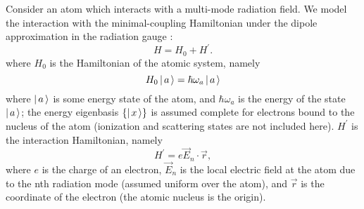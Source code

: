 \label{general dynamics}
Consider an atom which interacts with a multi-mode radiation field. We model the interaction with the minimal-coupling Hamiltonian under the dipole approximation in the radiation gauge \cite{Scully:1997a}:
\begin{equation}
H
=
H_{0}
+
H^{\prime}.
\end{equation}
where $H_0$ is the Hamiltonian of the atomic system, namely
\begin{equation}
H_0 \left| \hspace{0.15em} a \hspace{0.15em}\right\rangle
=
\hbar \omega_a \left| \hspace{0.15em} a \hspace{0.15em}\right\rangle
\end{equation}
where $\left| \hspace{0.15em} a \hspace{0.15em}\right\rangle$ is some energy state of the atom, and $\hbar \omega_a$ is the energy of the state $\left| \hspace{0.15em} a \hspace{0.15em}\right\rangle$; the energy eigenbasis $\{\left| \hspace{0.15em} x \hspace{0.15em}\right\rangle\}$ is assumed complete for electrons bound to the nucleus of the atom (ionization and scattering states are not included here). $H^{\prime}$ is the interaction Hamiltonian, namely
\begin{equation}
H^{\prime}
=
e \vec{E}_n \cdot \vec{r},
\end{equation}
where $e$ is the charge of an electron, $\vec{E}_n$ is the local electric field at the atom due to the nth radiation mode (assumed uniform over the atom), and $\vec{r}$ is the coordinate of the electron (the atomic nucleus is the origin).

